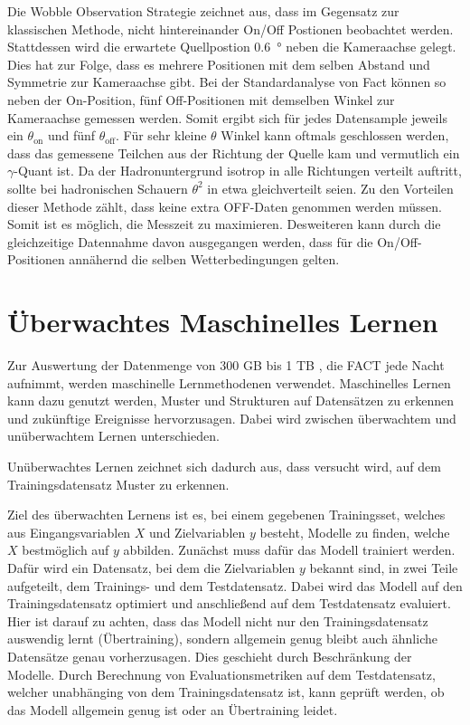 Die Wobble Observation Strategie zeichnet aus, dass im Gegensatz zur klassischen Methode, nicht hintereinander On/Off Postionen beobachtet werden. 
Stattdessen wird die erwartete Quellpostion \SI{0.6}{\degree} neben die Kameraachse gelegt. 
Dies hat zur Folge, dass es mehrere Positionen mit dem selben Abstand und Symmetrie zur Kameraachse gibt. 
Bei der Standardanalyse von Fact können so neben der On-Position, fünf Off-Positionen mit demselben Winkel zur Kameraachse gemessen werden. 
Somit ergibt sich für jedes Datensample jeweils ein $\theta_\text{on}$ und fünf $\theta_\text{off}$. 
Für sehr kleine $\theta$ Winkel kann oftmals geschlossen werden, dass das gemessene Teilchen aus der Richtung der Quelle kam und vermutlich ein $\gamma$-Quant ist. 
Da der Hadronuntergrund isotrop in alle Richtungen verteilt auftritt, sollte bei hadronischen Schauern $\theta^{2}$ in etwa gleichverteilt seien. 
Zu den Vorteilen dieser Methode zählt, dass keine extra OFF-Daten genommen werden müssen. 
Somit ist es möglich, die Messzeit zu maximieren. 
Desweiteren kann durch die gleichzeitige Datennahme davon ausgegangen werden, dass für die On/Off-Positionen annähernd die selben Wetterbedingungen gelten. 

\chapter{Überwachtes Maschinelles Lernen}
Zur Auswertung der Datenmenge von 300 GB bis 1 TB \cite{MaxNoethe}, die FACT jede Nacht aufnimmt, werden maschinelle Lernmethodenen verwendet. 
Maschinelles Lernen kann dazu genutzt werden, Muster und Strukturen auf Datensätzen zu erkennen und zukünftige Ereignisse hervorzusagen. 
Dabei wird zwischen überwachtem und unüberwachtem Lernen unterschieden.

Unüberwachtes Lernen zeichnet sich dadurch aus, dass versucht wird, auf dem Trainingsdatensatz Muster zu erkennen.  

Ziel des überwachten Lernens ist es, bei einem gegebenen Trainingsset, welches aus Eingangsvariablen $X$ und Zielvariablen $y$ besteht, Modelle zu finden, welche $X$ bestmöglich auf $y$ abbilden. 
Zunächst muss dafür das Modell trainiert werden. 
Dafür wird ein Datensatz, bei dem die Zielvariablen $y$ bekannt sind, in zwei Teile aufgeteilt, dem Trainings- und dem Testdatensatz. 
Dabei wird das Modell auf den Trainingsdatensatz optimiert und anschließend auf dem Testdatensatz evaluiert. 
Hier ist darauf zu achten, dass das Modell nicht nur den Trainingsdatensatz auswendig lernt (Übertraining), sondern allgemein genug bleibt auch ähnliche Datensätze genau vorherzusagen. 
Dies geschieht durch Beschränkung der Modelle. 
Durch Berechnung von Evaluationsmetriken auf dem Testdatensatz, welcher unabhänging von dem Trainingsdatensatz ist, kann geprüft werden, ob das Modell allgemein genug ist oder an Übertraining leidet.
